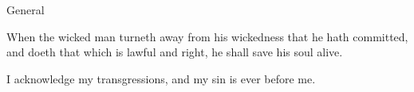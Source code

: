 \begin{multicols}{2}
\begin{inhead}
General
\end{inhead}\noindent
    When the wicked man turneth away from his wickedness that he hath committed, and doeth that which is lawful and right, he shall save his soul alive.\par

    I acknowledge my transgressions, and my sin is ever before me.\par


\end{multicols}
